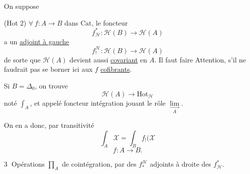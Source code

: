 On suppose

(Hot 2) $\forall\ f:A\longrightarrow B$ dans $\mathrm{Cat}$, le foncteur
\[
f_{\mathcal H}^{*}:\mathcal H(B)\longrightarrow\mathcal H(A)
\]
a un \uline{adjoint à gauche}
\[
f_!^{\mathcal H}:\mathcal H(B)\longrightarrow\mathcal H(A)
\]
de sorte que $\mathcal H(A)$ devient aussi \uline{covariant} en
$A$.
Il faut faire Attention, s'il ne faudrait pas
se borner ici aux $f$ \uline{cofibrants}.

Si $B=\Delta_0$, on trouve
\[
\mathcal H(A)\longrightarrow\mathrm{Hot}_{\mathcal H}
\]
noté $\int_A$, et appelé foncteur intégration
jouant le rôle  $\underset{A}{\underset{\longrightarrow}{\lim}}$.

On en a donc, par transitivité
\[
\int_A\mathcal X=\int_B f_!(\mathcal X
\]
\[
f:A\longrightarrow B.
\]

\textcircled{3} Opérations $\prod_A$ de cointégration,
par des $f_*^{\mathcal H}$ adjoints à droite des $f_{\mathcal H}^{*}$.
